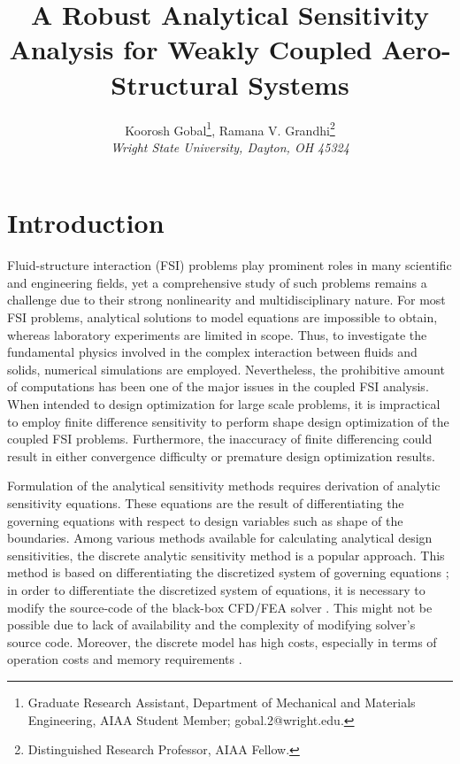 \documentclass[12pt]{aiaa-pretty}
\author[Gobal, Kohler, and Grandhi]{ %
Koorosh Gobal\thanks{Graduate Research Assistant, Department of Mechanical and Materials Engineering, AIAA Student Member; gobal.2@wright.edu.},
Ramana V. Grandhi\thanks{Distinguished Research Professor, AIAA Fellow.}\\
\textit{Wright State University, Dayton, OH 45324}}
\title{A Robust Analytical Sensitivity Analysis for Weakly Coupled Aero-Structural Systems}
\begin{document}
\maketitle
\section{Introduction}
Fluid-structure interaction (FSI) problems play prominent roles in many scientific and engineering fields, yet a comprehensive study of such problems remains a challenge due to their strong nonlinearity and multidisciplinary nature. For most FSI problems, analytical solutions to model equations are impossible to obtain, whereas laboratory experiments are limited in scope. Thus, to investigate the fundamental physics involved in the complex interaction between fluids and solids, numerical simulations are employed. Nevertheless, the prohibitive amount of computations has been one of the major issues in the coupled FSI analysis. When intended to design optimization for large scale problems, it is impractical to employ finite difference sensitivity to perform shape design optimization of the coupled FSI problems. Furthermore, the inaccuracy of finite differencing could result in either convergence difficulty or premature design optimization results.

Formulation of the analytical sensitivity methods requires derivation of analytic sensitivity equations. These equations are the result of differentiating the governing equations with respect to design variables such as shape of the boundaries. Among various methods available for calculating analytical design sensitivities, the discrete analytic sensitivity method is a popular approach. This method is based on differentiating the discretized system of governing equations \cite{martins2013review}; in order to differentiate the discretized system of equations, it is necessary to modify the source-code of the black-box CFD/FEA solver \cite{cross2014local}. This might not be possible due to lack of availability and the complexity of modifying solver's source code. Moreover, the discrete model has high costs, especially in terms of operation costs and memory requirements \cite{peter2010numerical}.
\end{document}

